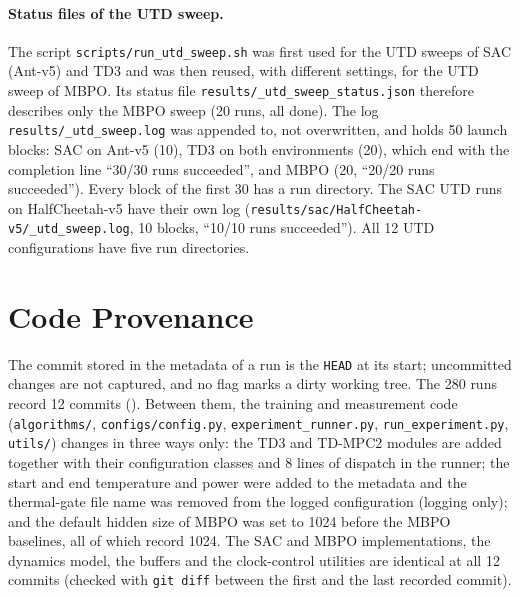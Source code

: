 \paragraph{Status files of the UTD sweep.} The script \texttt{scripts/\allowbreak run\_\allowbreak utd\_\allowbreak sweep.sh} was first used for the UTD sweeps of SAC (Ant-v5) and TD3 and was then reused, with different settings, for the UTD sweep of MBPO.
Its status file \texttt{results/\allowbreak \_\allowbreak utd\_\allowbreak sweep\_\allowbreak status.json} therefore describes only the MBPO sweep (\num{20} runs, all done).
The log \texttt{results/\allowbreak \_\allowbreak utd\_\allowbreak sweep.log} was appended to, not overwritten, and holds \num{50} launch blocks: SAC on Ant-v5 (\num{10}), TD3 on both environments (\num{20}), which end with the completion line ``\num{30}/\num{30} runs succeeded'', and MBPO (\num{20}, ``\num{20}/\num{20} runs succeeded'').
Every block of the first \num{30} has a run directory.
The SAC UTD runs on HalfCheetah-v5 have their own log (\texttt{results/\allowbreak sac/\allowbreak HalfCheetah-v5/\allowbreak \_\allowbreak utd\_\allowbreak sweep.log}, \num{10} blocks, ``\num{10}/\num{10} runs succeeded'').
All \num{12} UTD configurations have five run directories.

\section{Code Provenance}\label{sec:app-repro-code}

The commit stored in the metadata of a run is the \texttt{HEAD} at its start; uncommitted changes are not captured, and no flag marks a dirty working tree.
The \num{280} runs record \num{12} commits ().
Between them, the training and measurement code (\texttt{algorithms/\allowbreak }, \texttt{configs/\allowbreak config.py}, \texttt{experiment\_\allowbreak runner.py}, \texttt{run\_\allowbreak experiment.py}, \texttt{utils/\allowbreak }) changes in three ways only: the TD3 and TD-MPC2 modules are added together with their configuration classes and \num{8} lines of dispatch in the runner; the start and end temperature and power were added to the metadata and the thermal-gate file name was removed from the logged configuration (logging only); and the default hidden size of MBPO was set to \num{1024} before the MBPO baselines, all of which record \num{1024}.
The SAC and MBPO implementations, the dynamics model, the buffers and the clock-control utilities are identical at all \num{12} commits (checked with \texttt{git diff} between the first and the last recorded commit).

